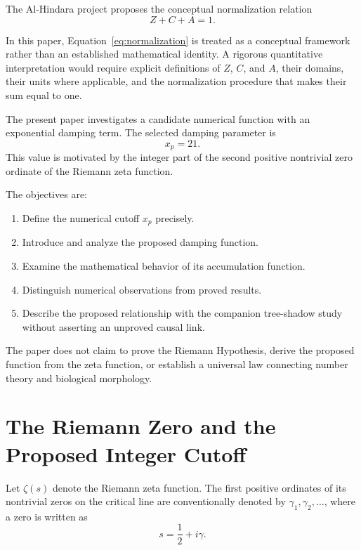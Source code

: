 \documentclass[11pt,a4paper]{article}
\begin{document}
The Al-Hindara project proposes the conceptual normalization
relation
\begin{equation}
Z+C+A=1.
\label{eq:normalization}
\end{equation}

In this paper, Equation~\eqref{eq:normalization} is treated
as a conceptual framework rather than an established
mathematical identity. A rigorous quantitative interpretation
would require explicit definitions of \(Z\), \(C\), and \(A\),
their domains, their units where applicable, and the
normalization procedure that makes their sum equal to one.

The present paper investigates a candidate numerical function
with an exponential damping term. The selected damping
parameter is
\[
x_p=21.
\]
This value is motivated by the integer part of the second
positive nontrivial zero ordinate of the Riemann zeta function.

The objectives are:

\begin{enumerate}
\item Define the numerical cutoff \(x_p\) precisely.
\item Introduce and analyze the proposed damping function.
\item Examine the mathematical behavior of its accumulation
function.
\item Distinguish numerical observations from proved results.
\item Describe the proposed relationship with the companion
tree-shadow study without asserting an unproved causal link.
\end{enumerate}

The paper does not claim to prove the Riemann Hypothesis,
derive the proposed function from the zeta function, or
establish a universal law connecting number theory and
biological morphology.

\section{The Riemann Zero and the Proposed Integer Cutoff}

Let \(\zeta(s)\) denote the Riemann zeta function. The first
positive ordinates of its nontrivial zeros on the critical
line are conventionally denoted by \(\gamma_1,\gamma_2,\ldots\),
where a zero is written as
\[
s=\frac12+i\gamma.
\]
\end{document}
